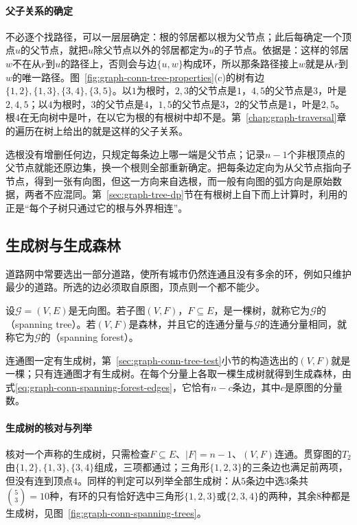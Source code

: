 \paragraph{父子关系的确定}
不必逐个找路径，可以一层层确定：根的邻居都以根为父节点；此后每确定一个顶点$u$的父节点，就把$u$除父节点以外的邻居都定为$u$的子节点。依据是：这样的邻居$w$不在从$r$到$u$的路径上，否则会与边$\{u,w\}$构成环，所以那条路径接上$w$就是从$r$到$w$的唯一路径。图~\ref{fig:graph-conn-tree-properties}(c)的树有边$\{1,2\},\{1,3\},\{3,4\},\{3,5\}$。以$1$为根时，$2,3$的父节点是$1$，$4,5$的父节点是$3$，叶是$2,4,5$；以$4$为根时，$3$的父节点是$4$，$1,5$的父节点是$3$，$2$的父节点是$1$，叶是$2,5$。根$4$在无向树中是叶，在以它为根的有根树中却不是。第~\ref{chap:graph-traversal}章的遍历在树上给出的就是这样的父子关系。

选根没有增删任何边，只规定每条边上哪一端是父节点；记录$n-1$个非根顶点的父节点就能还原边集，换一个根则全部重新确定。把每条边定向为从父节点指向子节点，得到一张有向图，但这一方向来自选根，而一般有向图的弧方向是原始数据，两者不应混同。第~\ref{sec:graph-tree-dp}节在有根树上自下而上计算时，利用的正是“每个子树只通过它的根与外界相连”。

\subsection{生成树与生成森林}
\label{sec:graph-conn-spanning-trees}

道路网中常要选出一部分道路，使所有城市仍然连通且没有多余的环，例如只维护最少的道路。所选的边必须取自原图，顶点则一个都不能少。

\begin{definition}[生成树与生成森林]
\label{def:graph-conn-spanning-tree}
设$\mathcal G=(V,E)$是无向图。若子图$(V,F)$，$F\subseteq E$，是一棵树，就称它为$\mathcal G$的（spanning tree）。若$(V,F)$是森林，并且它的连通分量与$\mathcal G$的连通分量相同，就称它为$\mathcal G$的（spanning forest）。
\end{definition}

连通图一定有生成树，第~\ref{sec:graph-conn-tree-test}小节的构造选出的$(V,F)$就是一棵；只有连通图才有生成树。在每个分量上各取一棵生成树就得到生成森林，由式\eqref{eq:graph-conn-spanning-forest-edges}，它恰有$n-c$条边，其中$c$是原图的分量数。

\paragraph{生成树的核对与列举}
核对一个声称的生成树，只需检查$F\subseteq E$、$|F|=n-1$、$(V,F)$连通。贯穿图的$T_2$由$\{1,2\},\{1,3\},\{3,4\}$组成，三项都通过；三角形$\{1,2,3\}$的三条边也满足前两项，但没有连到顶点$4$。同样的判定可以列举全部生成树：从$5$条边中选$3$条共$\binom53=10$种，有环的只有恰好选中三角形$\{1,2,3\}$或$\{2,3,4\}$的两种，其余$8$种都是生成树，见图~\ref{fig:graph-conn-spanning-trees}。

